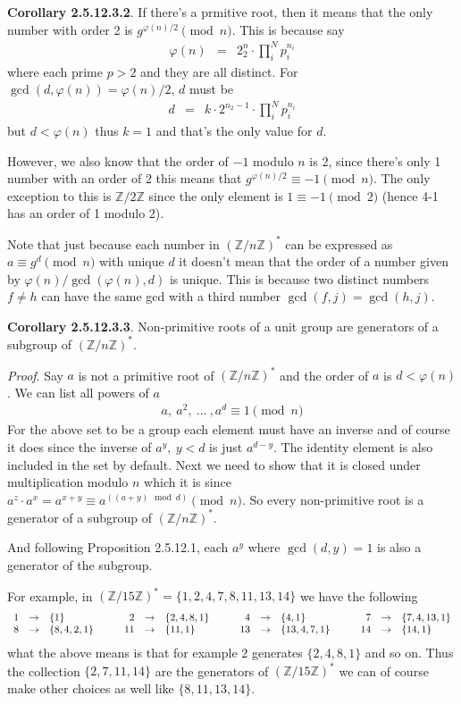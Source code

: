 \documentclass[aps,preprint,preprintnumbers,nofootinbib,showpacs,prd]{revtex4-1}
\newcommand{\ba}{\begin{array}}
\newcommand{\ea}{\end{array}}
\newcommand{\nbea}{\begin{eqnarray*}}
\newcommand{\neea}{\end{eqnarray*}}
\begin{document}
{\bf Corollary 2.5.12.3.2}. If there's a prmitive root, then it means that the only number with order 2 is $g^{\varphi(n)/2}\pmod{n}$. This is because say
%
\nbea
\varphi(n) & = & 2^n_2 \cdot \prod_i^{N} p_i^{n_i}
\neea
%
where each prime $p > 2$ and they are all distinct. For $\gcd(d, \varphi(n)) = \varphi(n)/2$, $d$ must be
%
\nbea
d & = & k\cdot 2^{n_2-1} \cdot \prod_i^{N} p_i^{n_i}
\neea
%
but $d < \varphi(n)$ thus $k=1$ and that's the only value for $d$.

However, we also know that the order of $-1$ modulo $n$ is 2, since there's only 1 number with an order of 2 this means that $g^{\varphi(n)/2} \equiv -1 \pmod{n}$. The only exception to this is $\mathbb{Z}/2\mathbb{Z}$ since the only element is $1\equiv-1\pmod{2}$ (hence 4-1 has an order of 1 modulo 2).

Note that just because each number in $(\mathbb{Z}/n\mathbb{Z})^*$ can be expressed as $a \equiv g^d \pmod{n}$ with unique $d$ it doesn't mean that the order of a number given by $\varphi(n)/\gcd(\varphi(n),d)$ is unique. This is because two distinct numbers $f\neq h$ can have the same gcd with a third number $\gcd(f,j) = \gcd(h,j)$.

{\bf Corollary 2.5.12.3.3}. Non-primitive roots of a unit group are generators of a subgroup of $(\mathbb{Z}/n\mathbb{Z})^*$.

{\it Proof}. Say $a$ is not a primitive root of $(\mathbb{Z}/n\mathbb{Z})^*$ and the order of $a$ is $d < \varphi(n)$. We can list all powers of $a$
%
\nbea
a,~a^2,~\dots~, a^d \equiv 1 \pmod{n}
\neea
%
For the above set to be a group each element must have an inverse and of course it does since the inverse of $a^y, ~ y < d$ is just $a^{d-y}$. The identity element is also included in the set by default. Next we need to show that it is closed under multiplication modulo $n$ which it is since $a^z \cdot a^x = a^{x+y} \equiv a^{((a+y) \mod d)} \pmod{n}$. So every non-primitive root is a generator of a subgroup of $(\mathbb{Z}/n\mathbb{Z})^*$.

And following Proposition 2.5.12.1, each $a^y$ where $\gcd(d,y) = 1$ is also a generator of the subgroup.

For example, in $(\mathbb{Z}/15\mathbb{Z})^* = \{1, 2,4, 7, 8, 11, 13, 14\}$ we have the following
%
\nbea
\ba{r c l c r c l c r c l c r c l}
1 & \to & \{1\} & ~~~ & 2 & \to & \{2, 4, 8, 1\} & ~~~ & 4 & \to & \{4, 1\} & ~~~ &7 & \to & \{7, 4, 13, 1\} \\
8 & \to & \{8, 4, 2, 1\} & & 11 & \to & \{11, 1\} & & 13 & \to & \{13, 4, 7, 1\} & ~~~ & 14 & \to & \{14, 1\}
\ea
\neea
%
what the above means is that for example $2$ generates $\{2, 4, 8, 1\}$ and so on. Thus the collection $\{2, 7, 11, 14\}$ are the generators of $(\mathbb{Z}/15\mathbb{Z})^*$ we can of course make other choices as well like $\{8, 11, 13, 14\}$.
\end{document}
